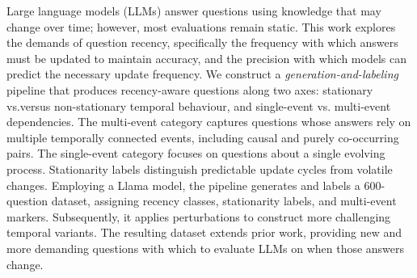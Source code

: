 Large language models (LLMs) answer questions using knowledge that may change over time; however, most evaluations remain static. This work explores the demands of question recency, specifically the frequency with which answers must be updated to maintain accuracy, and the precision with which models can predict the necessary update frequency. 
We construct a \textit{generation-and-labeling} pipeline that produces recency-aware questions along two axes: stationary vs.versus non-stationary temporal behaviour, and single-event vs. multi-event dependencies. The multi-event category captures questions whose answers rely on multiple temporally connected events, including causal and purely co-occurring pairs. The single-event category focuses on questions about a single evolving process. Stationarity labels distinguish predictable update cycles from volatile changes.
Employing a Llama model, the pipeline generates and labels a \num{600}-question dataset, assigning recency classes, stationarity labels, and multi-event markers. Subsequently, it applies perturbations to construct more challenging temporal variants. The resulting dataset extends prior work, providing new and more demanding questions with which to evaluate LLMs on when those answers change.